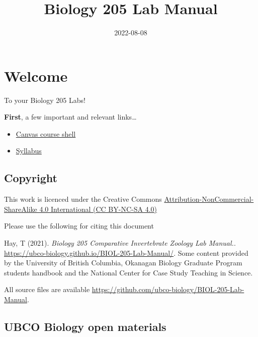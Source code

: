 \documentclass[
]{book}
\title{Biology 205 Lab Manual}
\author{}
\date{\vspace{-2.5em}2022-08-08}
\providecommand{\tightlist}{%
  \setlength{\itemsep}{0pt}\setlength{\parskip}{0pt}}
\begin{document}
\maketitle

{
\setcounter{tocdepth}{1}
\tableofcontents
}
\hypertarget{welcome}{%
\chapter*{Welcome}\label{welcome}}

To your Biology 205 Labs!

\textbf{First}, a few important and relevant links\ldots{}

\begin{itemize}
\tightlist
\item
  \href{https://canvas.ubc.ca/courses/113910}{Canvas course shell}
\item
  \href{https://canvas.ubc.ca/courses/113910/files/21718741?module_item_id=4662232}{Syllabus}
\end{itemize}

\hypertarget{copyright}{%
\section*{Copyright}\label{copyright}}

This work is licenced under the Creative Commons \href{https://creativecommons.org/licenses/by-nc-sa/4.0/}{Attribution-NonCommercial-ShareAlike 4.0 International (CC BY-NC-SA 4.0)}

Please use the following for citing this document

Hay, T (2021). \emph{Biology 205 Comparative Invertebrate Zoology Lab Manual.}. \url{https://ubco-biology.github.io/BIOL-205-Lab-Manual/}. Some content provided by the University of British Columbia, Okanagan Biology Graduate Program students handbook and the National Center for Case Study Teaching in Science.

All source files are available \url{https://github.com/ubco-biology/BIOL-205-Lab-Manual}.

\hypertarget{ubco-biology-open-materials}{%
\section*{UBCO Biology open materials}\label{ubco-biology-open-materials}}
\end{document}
